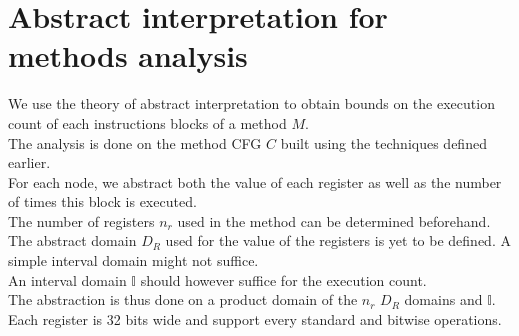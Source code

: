 \documentclass{article}
\begin{document}
\section*{Abstract interpretation for methods analysis}
We use the theory of abstract interpretation to obtain bounds on the execution count of each instructions blocks of a method $M$.\\
The analysis is done on the method CFG $C$ built using the techniques defined earlier.\\
For each node, we abstract both the value of each register as well as the number of times this block is executed.\\
The number of registers $n_r$ used in the method can be determined beforehand. The abstract domain $D_R$ used for the value of the registers is yet to be defined. A simple interval domain might not suffice.\\
An interval domain $\mathbb{I}$ should however suffice for the execution count.\\
The abstraction is thus done on a product domain of  the $n_r$ $D_R$ domains and $\mathbb{I}$.\\
Each register is 32 bits wide and support every standard and bitwise operations.\\ 


\nocite{*}

\end{document}
